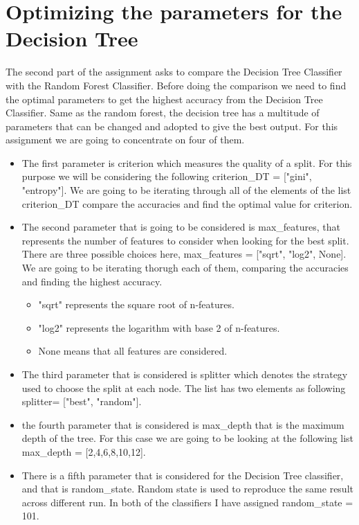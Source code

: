 \documentclass{article}
\begin{document}
\section{Optimizing the parameters for the Decision Tree}
The second part of the assignment asks to compare the Decision Tree Classifier with the Random Forest Classifier. Before doing the comparison we need to find the optimal parameters to get the highest accuracy from the Decision Tree Classifier. 
Same as the random forest, the decision tree  has a multitude of parameters that can be changed and adopted to give the best output.  For this assignment we are going to concentrate on four of them.
\begin{itemize}
    \item The first parameter is criterion which measures the quality of a split. For this purpose we will be considering the following  criterion\_DT = ["gini", "entropy"]. We are going to be iterating through all of the elements of the list criterion\_DT compare the accuracies and find the optimal value for criterion. 
    \item The second parameter that is going to be considered is max\_features, that represents the number of features to consider when looking for the best split. There are three possible choices here, max\_features = ["sqrt", "log2", None]. We are going to be iterating thorugh each of them, comparing the accuracies and finding the highest accuracy. 
    \begin{itemize}
        \item "sqrt" represents the square root of n-features.
        \item "log2" represents the logarithm with base 2 of n-features. 
        \item None means that all features are considered.
    \end{itemize}
    \item The third parameter that is considered is splitter which denotes the strategy used to choose the split at each node. The list has two elements as following splitter= ["best", "random"].
    \item the fourth parameter that is considered is max\_depth that is the maximum depth of the tree. For this case we are going to be looking at the following list max\_depth = [2,4,6,8,10,12].
    \item There is a fifth parameter that is considered for the Decision Tree classifier, and that is random\_state. Random state is used to reproduce the same result across different run. In both of the classifiers I have assigned random\_state = 101.
\end{itemize}
\end{document}
